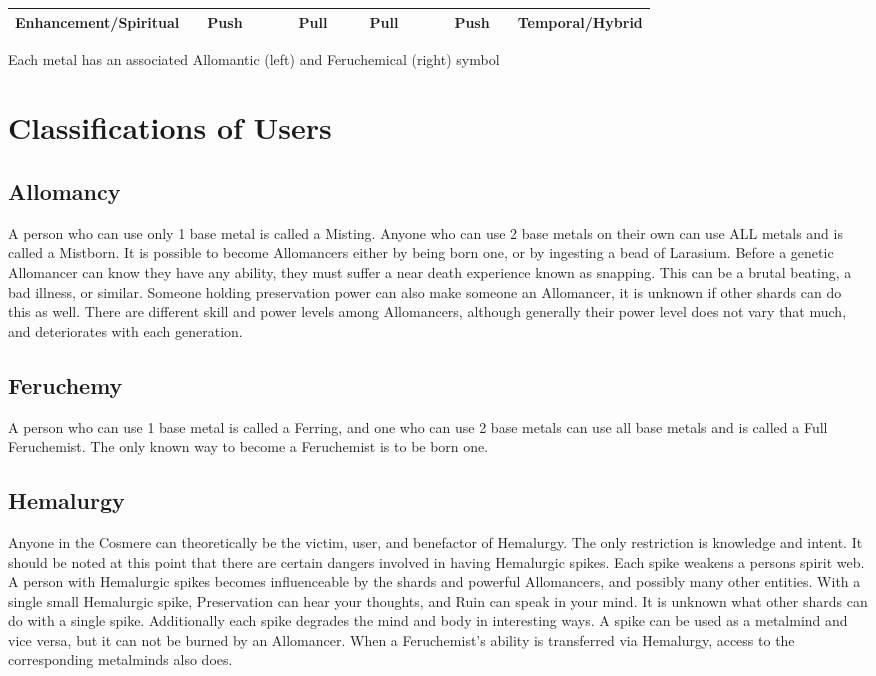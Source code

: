 \documentclass[conference]{IEEEtran}
\begin{document}
\begin{table}[!hb]
\begin{tabular}{ |l |ccc c ccc | ccc c ccc | r| }
		Enhancement/Spiritual&&Push&&&&Pull&&&Pull&&&&Push&&Temporal/Hybrid\\\hline
	\end{tabular}
\vspace{0.5em}\break
Each metal has an associated Allomantic (left) and Feruchemical (right) symbol
	\label{metals}
\end{table}
\hfill
\section*{Classifications of Users}

\subsection*{Allomancy}
A person who can use only 1 base metal is called a Misting.  Anyone who can use 2 base metals on their own can use ALL metals and is called a Mistborn.  It is possible to become Allomancers either by being born one, or by ingesting a bead of Larasium.  Before a genetic Allomancer can know they have any ability, they must suffer a near death experience known as snapping.  This can be a brutal beating, a bad illness, or similar.  Someone holding preservation power can also make someone an Allomancer, it is unknown if other shards can do this as well.  There are different skill and power levels among Allomancers, although generally their power level does not vary that much, and deteriorates with each generation.  
\subsection*{Feruchemy}
A person who can use 1 base metal is called a Ferring, and one who can use 2 base metals can use all base metals and is called a Full Feruchemist.  The only known way to become a Feruchemist is to be born one.

\subsection*{Hemalurgy}
Anyone in the Cosmere can theoretically be the victim, user, and benefactor of Hemalurgy.  The only restriction is knowledge and intent.
It should be noted at this point that there are certain dangers involved in having Hemalurgic spikes.  Each spike weakens a persons spirit web.  A person with Hemalurgic spikes becomes influenceable  by the shards and powerful Allomancers, and possibly many other entities.
With a single small Hemalurgic spike, Preservation can hear your thoughts, and Ruin can speak in your mind.  It is unknown what other shards can do with a single spike.
Additionally each spike degrades the mind and body in interesting ways.  
A spike can be used as a metalmind and vice versa, but it can not be burned by an Allomancer.
When a Feruchemist's ability is transferred via Hemalurgy, access to the corresponding metalminds also does.
\end{document}
